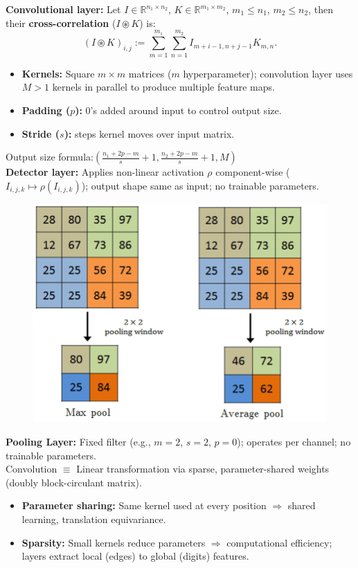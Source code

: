 \documentclass[a4paper,10pt]{article}
\newenvironment{myitemize}
{\vspace{-0.25cm}\begin{itemize}}
{\end{itemize}}
\begin{document}
\begin{small}
\textbf{Convolutional layer:} Let $I \in \mathbb{R}^{n_1 \times n_2}$, $K \in \mathbb{R}^{m_1 \times m_2}$, $m_1 \leq n_1$, $m_2 \leq n_2$, then their \textbf{cross-correlation} ($I \circledast K$) is:
$$
(I \circledast K)_{i,j} := \sum_{m=1}^{m_1} \sum_{n=1}^{m_2} I_{m+i-1, n+j-1} K_{m, n}.
$$

\begin{myitemize}
    \item \textbf{Kernels:} Square $m \times m$ matrices ($m$ hyperparameter); convolution layer uses $M > 1$ kernels in parallel to produce multiple feature maps.
    \item \textbf{Padding ($p$):} 0's added around input to control output size.
    \item \textbf{Stride ($s$):} steps kernel moves over input matrix.
\end{myitemize}

Output size formula:$\left( \frac{n_1 + 2p - m}{s} + 1, \frac{n_2 + 2p - m}{s} + 1, M \right)$ \\

\textbf{Detector layer:}
Applies non-linear activation $\rho$ component-wise ($I_{i,j,k} \mapsto \rho(I_{i,j,k})$); output shape same as input; no trainable parameters.

\begin{figure}
    \centering
    \vspace{-25pt}
    \includegraphics[width=0.27\columnwidth]{figures/Visual-representation-of-pooling-operations-a-max-pooling-b-average-pooling}
    \vspace{-20pt}
\end{figure}

\textbf{Pooling Layer:} Fixed filter (e.g., $m=2$, $s=2$, $p=0$); operates per channel; no trainable parameters.
\\

Convolution $\equiv$ Linear transformation via sparse, parameter-shared weights (doubly block-circulant matrix).

\begin{myitemize}
    \item \textbf{Parameter sharing:} Same kernel used at every position $\Rightarrow$ shared learning, translation equivariance.
    \item \textbf{Sparsity:} Small kernels reduce parameters $\Rightarrow$ computational efficiency; layers extract local (edges) to global (digits) features.
\end{myitemize}


\end{small}
\end{document}
